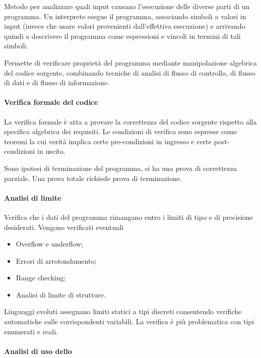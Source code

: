 Metodo per analizzare quali input causano l'esecuzione delle diverse parti di un
programma. Un interprete esegue il programma, associando simboli a valori in
input (invece che usare valori provenienti dall'effettiva esecuzione) e
arrivando quindi a descrivere il programma come espressioni e vincoli in termini
di tali simboli.

Permette di verificare proprietà del programma mediante manipolazione algebrica
del codice sorgente, combinando tecniche di analisi di flusso di controllo, di
flusso di dati e di flusso di informazione.

\paragraph{Verifica formale del codice}
\label{par:verifica_formale_del_codice}

La verifica formale è atta a provare la correttezza del codice sorgente
rispetto alla specifica algebrica dei
requisiti. Le condizioni di verifica sono espresse come teoremi la cui verità
implica certe pre-condizioni in ingresso e certe post-condizioni in uscita.

Sono ipotesi di terminazione del programma, si ha una prova di correttezza
parziale. Una prova totale richiede prova di terminazione.

\paragraph{Analisi di limite}
\label{par:analisi_di_limite}

Verifica che i dati del programma rimangano entro i limiti di tipo e di
precisione desiderati. Vengono verificati eventuali

\begin{itemize}
  \item Overflow e underflow;
  \item Errori di arrotondamento;
  \item Range checking;
  \item Analisi di limite di strutture.
\end{itemize}

Linguaggi evoluti assegnano limiti statici a tipi discreti consentendo verifiche
automatiche sulle corrispondenti variabili. La verifica è più problematica con
tipi enumerati e reali.

\paragraph{Analisi di uso dello }
\label{par:analisi_di_uso_dello_frgnword_stack}

